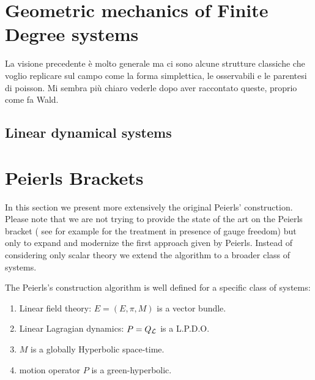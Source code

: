 \documentclass[Main]{subfiles}
\begin{document}
	\section{Geometric mechanics of Finite Degree systems}
	 La visione precedente è molto generale ma ci sono alcune strutture classiche che voglio replicare sul campo come la forma simplettica, le osservabili e le parentesi di poisson.
	 Mi sembra più chiaro vederle dopo aver raccontato queste, proprio come fa Wald.
	
	\subsection{Linear dynamical systems}	
	
\newpage
	\section{Peierls Brackets}
	In this section we present more extensively the original Peierls' construction. 
	Please note that we are not trying to provide the state of the art on the Peierls bracket ( see for example \cite{Khavkine2014} for the treatment in presence of gauge freedom) but only to expand and modernize the first approach given by Peierls.
	Instead of considering only scalar theory we extend the algorithm to a broader class of systems.
	
	The Peierls's construction algorithm is well defined for a specific class of systems:
		\begin{enumerate}
			\item Linear field theory: $E=(E,\pi,M)$ is a vector bundle.
			\item Linear Lagragian dynamics: $P=Q_{\mathcal{L}}$ is a L.P.D.O.
			\item $M$ is a globally Hyperbolic space-time.
			\item motion operator $P$ is a green-hyperbolic.
		\end{enumerate}
		
\end{document}
